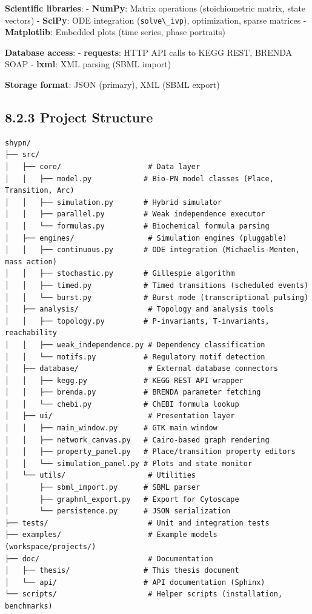 \textbf{Scientific libraries}: - \textbf{NumPy}: Matrix operations
(stoichiometric matrix, state vectors) - \textbf{SciPy}: ODE integration
(\passthrough{\lstinline!solve\_ivp!}), optimization, sparse matrices -
\textbf{Matplotlib}: Embedded plots (time series, phase portraits)

\textbf{Database access}: - \textbf{requests}: HTTP API calls to KEGG
REST, BRENDA SOAP - \textbf{lxml}: XML parsing (SBML import)

\textbf{Storage format}: JSON (primary), XML (SBML export)

\hypertarget{project-structure}{%
\subsection{8.2.3 Project Structure}\label{project-structure}}

\begin{lstlisting}
shypn/
├── src/
│   ├── core/                    # Data layer
│   │   ├── model.py            # Bio-PN model classes (Place, Transition, Arc)
│   │   ├── simulation.py       # Hybrid simulator
│   │   ├── parallel.py         # Weak independence executor
│   │   └── formulas.py         # Biochemical formula parsing
│   ├── engines/                 # Simulation engines (pluggable)
│   │   ├── continuous.py       # ODE integration (Michaelis-Menten, mass action)
│   │   ├── stochastic.py       # Gillespie algorithm
│   │   ├── timed.py            # Timed transitions (scheduled events)
│   │   └── burst.py            # Burst mode (transcriptional pulsing)
│   ├── analysis/                # Topology and analysis tools
│   │   ├── topology.py         # P-invariants, T-invariants, reachability
│   │   ├── weak_independence.py # Dependency classification
│   │   └── motifs.py           # Regulatory motif detection
│   ├── database/                # External database connectors
│   │   ├── kegg.py             # KEGG REST API wrapper
│   │   ├── brenda.py           # BRENDA parameter fetching
│   │   └── chebi.py            # ChEBI formula lookup
│   ├── ui/                      # Presentation layer
│   │   ├── main_window.py      # GTK main window
│   │   ├── network_canvas.py   # Cairo-based graph rendering
│   │   ├── property_panel.py   # Place/transition property editors
│   │   └── simulation_panel.py # Plots and state monitor
│   └── utils/                   # Utilities
│       ├── sbml_import.py      # SBML parser
│       ├── graphml_export.py   # Export for Cytoscape
│       └── persistence.py      # JSON serialization
├── tests/                       # Unit and integration tests
├── examples/                    # Example models (workspace/projects/)
├── doc/                         # Documentation
│   ├── thesis/                 # This thesis document
│   └── api/                    # API documentation (Sphinx)
└── scripts/                     # Helper scripts (installation, benchmarks)
\end{lstlisting}

